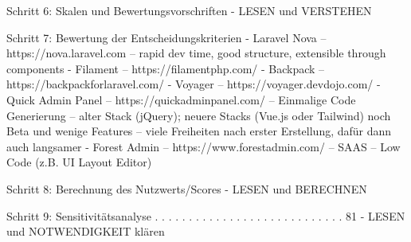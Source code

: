 Schritt 6: Skalen und Bewertungsvorschriften
- LESEN und VERSTEHEN

Schritt 7: Bewertung der Entscheidungskriterien
- Laravel Nova
-- https://nova.laravel.com
-- rapid dev time, good structure, extensible through components
- Filament
-- https://filamentphp.com/
- Backpack
-- https://backpackforlaravel.com/
- Voyager
-- https://voyager.devdojo.com/
- Quick Admin Panel
-- https://quickadminpanel.com/
-- Einmalige Code Generierung
-- alter Stack (jQuery); neuere Stacks (Vue.js oder Tailwind) noch Beta und wenige Features
-- viele Freiheiten nach erster Erstellung, dafür dann auch langsamer
- Forest Admin
-- https://www.forestadmin.com/
-- SAAS
-- Low Code (z.B. UI Layout Editor)

Schritt 8: Berechnung des Nutzwerts/Scores
- LESEN und BERECHNEN

Schritt 9: Sensitivitätsanalyse . . . . . . . . . . . . . . . . . . . . . . . . . . . . 81
- LESEN und NOTWENDIGKEIT klären
